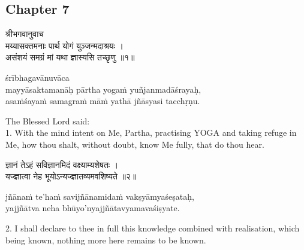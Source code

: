 \chapterdrop

\begin{center}

\headerspace
{}

\section{Chapter 7}

\headerspace
{}

\headerspace
{}

\headerspace
{}

\headerspace
\end{center}

\begin{gitaverse}
श्रीभगवानुवाच \\
मय्यासक्तमनाः पार्थ योगं युञ्जन्मदाश्रयः । \\
असंशयं समग्रं मां यथा ज्ञास्यसि तच्छृणु ॥१॥
\end{gitaverse}

\begin{transliteration}
śrībhagavānuvāca \\
mayyāsaktamanāḥ pārtha yogaṁ yuñjanmadāśrayaḥ, \\
asaṁśayaṁ samagraṁ māṁ yathā jñāsyasi tacchṛṇu.
\end{transliteration}

The Blessed Lord said: \\
1. With the mind intent on Me, Partha, practising YOGA and taking refuge in Me,
how thou shalt, without doubt, know Me fully, that do thou hear.

\begin{gitaverse}
ज्ञानं तेऽहं सविज्ञानमिदं वक्ष्याम्यशेषतः । \\
यज्ज्ञात्वा नेह भूयोऽन्यज्ज्ञातव्यमवशिष्यते ॥२॥
\end{gitaverse}

\begin{transliteration}
jñānaṁ te'haṁ savijñānamidaṁ vakṣyāmyaśeṣataḥ, \\
yajjñātva neha bhūyo'nyajjñātavyamavaśiṣyate.
\end{transliteration}

2. I shall declare to thee in full this knowledge combined with realisation,
which being known, nothing more here remains to be known.

